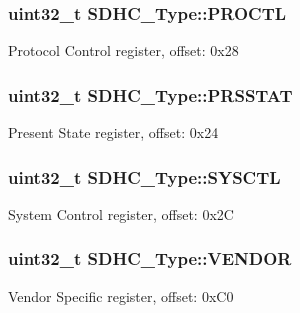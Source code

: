 \subsubsection[{\texorpdfstring{P\+R\+O\+C\+TL}{PROCTL}}]{ uint32\+\_\+t S\+D\+H\+C\+\_\+\+Type\+::\+P\+R\+O\+C\+TL}\hypertarget{structSDHC__Type_aff7ce95313465bc87dc72f0411e364dd}{}\label{structSDHC__Type_aff7ce95313465bc87dc72f0411e364dd}
Protocol Control register, offset\+: 0x28 
\subsubsection[{\texorpdfstring{P\+R\+S\+S\+T\+AT}{PRSSTAT}}]{ uint32\+\_\+t S\+D\+H\+C\+\_\+\+Type\+::\+P\+R\+S\+S\+T\+AT}\hypertarget{structSDHC__Type_ad259cb56a5f2395fb1c29bf23ad45586}{}\label{structSDHC__Type_ad259cb56a5f2395fb1c29bf23ad45586}
Present State register, offset\+: 0x24 
\subsubsection[{\texorpdfstring{S\+Y\+S\+C\+TL}{SYSCTL}}]{ uint32\+\_\+t S\+D\+H\+C\+\_\+\+Type\+::\+S\+Y\+S\+C\+TL}\hypertarget{structSDHC__Type_ab90a257351d9e9d361f51bcbe48e84e4}{}\label{structSDHC__Type_ab90a257351d9e9d361f51bcbe48e84e4}
System Control register, offset\+: 0x2C 
\subsubsection[{\texorpdfstring{V\+E\+N\+D\+OR}{VENDOR}}]{ uint32\+\_\+t S\+D\+H\+C\+\_\+\+Type\+::\+V\+E\+N\+D\+OR}\hypertarget{structSDHC__Type_ade0658e5c75b98bb8419f5b68857fa4c}{}\label{structSDHC__Type_ade0658e5c75b98bb8419f5b68857fa4c}
Vendor Specific register, offset\+: 0x\+C0 
